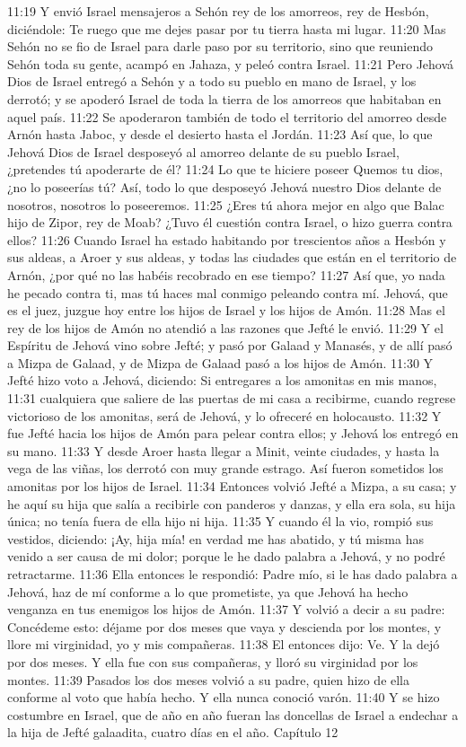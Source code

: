 11:19 Y envió Israel mensajeros a Sehón rey de los amorreos, rey de Hesbón, diciéndole: Te ruego que me dejes pasar por tu tierra hasta mi lugar.  
11:20 Mas Sehón no se fio de Israel para darle paso por su territorio, sino que reuniendo Sehón toda su gente, acampó en Jahaza, y peleó contra Israel.  
11:21 Pero Jehová Dios de Israel entregó a Sehón y a todo su pueblo en mano de Israel, y los derrotó; y se apoderó Israel de toda la tierra de los amorreos que habitaban en aquel país.  
11:22 Se apoderaron también de todo el territorio del amorreo desde Arnón hasta Jaboc, y desde el desierto hasta el Jordán. 
11:23 Así que, lo que Jehová Dios de Israel desposeyó al amorreo delante de su pueblo Israel, ¿pretendes tú apoderarte de él?  
11:24 Lo que te hiciere poseer Quemos tu dios, ¿no lo poseerías tú? Así, todo lo que desposeyó Jehová nuestro Dios delante de nosotros, nosotros lo poseeremos.  
11:25 ¿Eres tú ahora mejor en algo que Balac hijo de Zipor, rey de Moab? ¿Tuvo él cuestión contra Israel, o hizo guerra contra ellos?  
11:26 Cuando Israel ha estado habitando por trescientos años a Hesbón y sus aldeas, a Aroer y sus aldeas, y todas las ciudades que están en el territorio de Arnón, ¿por qué no las habéis recobrado en ese tiempo? 
11:27 Así que, yo nada he pecado contra ti, mas tú haces mal conmigo peleando contra mí. Jehová, que es el juez, juzgue hoy entre los hijos de Israel y los hijos de Amón.  
11:28 Mas el rey de los hijos de Amón no atendió a las razones que Jefté le envió.  
11:29 Y el Espíritu de Jehová vino sobre Jefté; y pasó por Galaad y Manasés, y de allí pasó a Mizpa de Galaad, y de Mizpa de Galaad pasó a los hijos de Amón.  
11:30 Y Jefté hizo voto a Jehová, diciendo: Si entregares a los amonitas en mis manos,  
11:31 cualquiera que saliere de las puertas de mi casa a recibirme, cuando regrese victorioso de los amonitas, será de Jehová, y lo ofreceré en holocausto.  
11:32 Y fue Jefté hacia los hijos de Amón para pelear contra ellos; y Jehová los entregó en su mano.  
11:33 Y desde Aroer hasta llegar a Minit, veinte ciudades, y hasta la vega de las viñas, los derrotó con muy grande estrago. Así fueron sometidos los amonitas por los hijos de Israel.  
11:34 Entonces volvió Jefté a Mizpa, a su casa; y he aquí su hija que salía a recibirle con panderos y danzas, y ella era sola, su hija única; no tenía fuera de ella hijo ni hija.  
11:35 Y cuando él la vio, rompió sus vestidos, diciendo: ¡Ay, hija mía! en verdad me has abatido, y tú misma has venido a ser causa de mi dolor; porque le he dado palabra a Jehová, y no podré retractarme. 
11:36 Ella entonces le respondió: Padre mío, si le has dado palabra a Jehová, haz de mí conforme a lo que prometiste, ya que Jehová ha hecho venganza en tus enemigos los hijos de Amón.  
11:37 Y volvió a decir a su padre: Concédeme esto: déjame por dos meses que vaya y descienda por los montes, y llore mi virginidad, yo y mis compañeras.  
11:38 El entonces dijo: Ve. Y la dejó por dos meses. Y ella fue con sus compañeras, y lloró su virginidad por los montes.  
11:39 Pasados los dos meses volvió a su padre, quien hizo de ella conforme al voto que había hecho. Y ella nunca conoció varón.  
11:40 Y se hizo costumbre en Israel, que de año en año fueran las doncellas de Israel a endechar a la hija de Jefté galaadita, cuatro días en el año.  
Capítulo 12


